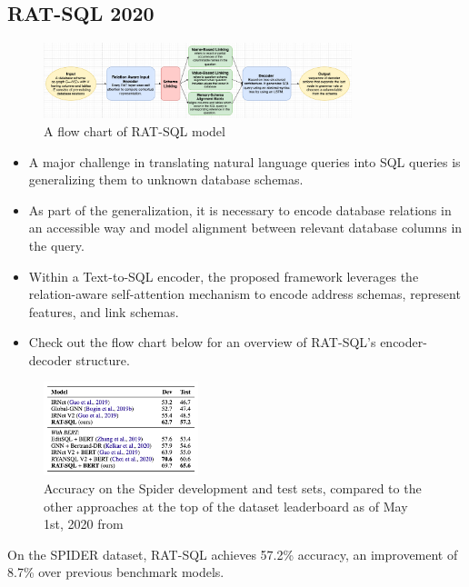 \subsection{RAT-SQL 2020}

\begin{figure}[htb]
    \centering
    \includegraphics[width=0.8\textwidth]{pics/RAT-SQL/flow.png}
    \caption{A flow chart of RAT-SQL model}
    \label{fig:RAT-SQL-flow}
\end{figure}

\begin{itemize}
    \item A major challenge in translating natural language queries into SQL queries is generalizing them to unknown database schemas.
    \item As part of the generalization, it is necessary to encode database relations in an accessible way and model alignment between relevant database columns in the query.
    \item Within a Text-to-SQL encoder, the proposed framework leverages the relation-aware self-attention mechanism to encode address schemas, represent features, and link schemas.
    \item Check out the flow chart below for an overview of RAT-SQL's encoder-decoder structure.
\end{itemize}

\begin{figure}[htb]
    \centering
    \includegraphics[width=0.4\textwidth]{pics/RAT-SQL/Accuracy.png}
    \caption{Accuracy on the Spider development and test sets, compared to the other approaches at the top of the dataset leaderboard as of May 1st, 2020 from \cite{wang_rat-sql_2021}}
    \label{fig:RAT-SQL-Accuracy}
\end{figure}

On the SPIDER dataset, RAT-SQL achieves 57.2\% accuracy, an improvement of 8.7\% over previous benchmark models.

